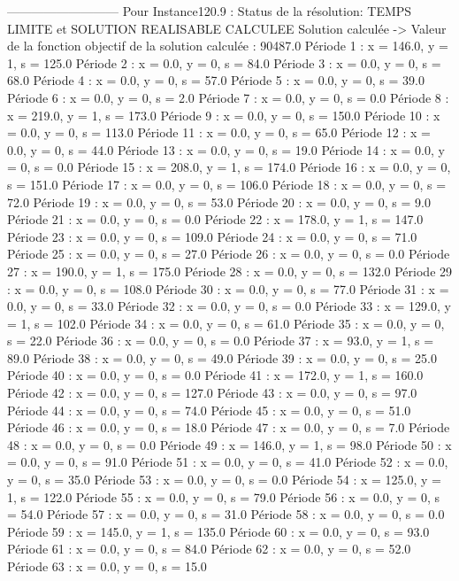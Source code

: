 ---------------------------
Pour Instance120.9 :
Status de la résolution: TEMPS LIMITE et SOLUTION REALISABLE CALCULEE
Solution calculée
-> Valeur de la fonction objectif de la solution calculée :  90487.0
Période 1 : x = 146.0, y = 1, s = 125.0
Période 2 : x = 0.0, y = 0, s = 84.0
Période 3 : x = 0.0, y = 0, s = 68.0
Période 4 : x = 0.0, y = 0, s = 57.0
Période 5 : x = 0.0, y = 0, s = 39.0
Période 6 : x = 0.0, y = 0, s = 2.0
Période 7 : x = 0.0, y = 0, s = 0.0
Période 8 : x = 219.0, y = 1, s = 173.0
Période 9 : x = 0.0, y = 0, s = 150.0
Période 10 : x = 0.0, y = 0, s = 113.0
Période 11 : x = 0.0, y = 0, s = 65.0
Période 12 : x = 0.0, y = 0, s = 44.0
Période 13 : x = 0.0, y = 0, s = 19.0
Période 14 : x = 0.0, y = 0, s = 0.0
Période 15 : x = 208.0, y = 1, s = 174.0
Période 16 : x = 0.0, y = 0, s = 151.0
Période 17 : x = 0.0, y = 0, s = 106.0
Période 18 : x = 0.0, y = 0, s = 72.0
Période 19 : x = 0.0, y = 0, s = 53.0
Période 20 : x = 0.0, y = 0, s = 9.0
Période 21 : x = 0.0, y = 0, s = 0.0
Période 22 : x = 178.0, y = 1, s = 147.0
Période 23 : x = 0.0, y = 0, s = 109.0
Période 24 : x = 0.0, y = 0, s = 71.0
Période 25 : x = 0.0, y = 0, s = 27.0
Période 26 : x = 0.0, y = 0, s = 0.0
Période 27 : x = 190.0, y = 1, s = 175.0
Période 28 : x = 0.0, y = 0, s = 132.0
Période 29 : x = 0.0, y = 0, s = 108.0
Période 30 : x = 0.0, y = 0, s = 77.0
Période 31 : x = 0.0, y = 0, s = 33.0
Période 32 : x = 0.0, y = 0, s = 0.0
Période 33 : x = 129.0, y = 1, s = 102.0
Période 34 : x = 0.0, y = 0, s = 61.0
Période 35 : x = 0.0, y = 0, s = 22.0
Période 36 : x = 0.0, y = 0, s = 0.0
Période 37 : x = 93.0, y = 1, s = 89.0
Période 38 : x = 0.0, y = 0, s = 49.0
Période 39 : x = 0.0, y = 0, s = 25.0
Période 40 : x = 0.0, y = 0, s = 0.0
Période 41 : x = 172.0, y = 1, s = 160.0
Période 42 : x = 0.0, y = 0, s = 127.0
Période 43 : x = 0.0, y = 0, s = 97.0
Période 44 : x = 0.0, y = 0, s = 74.0
Période 45 : x = 0.0, y = 0, s = 51.0
Période 46 : x = 0.0, y = 0, s = 18.0
Période 47 : x = 0.0, y = 0, s = 7.0
Période 48 : x = 0.0, y = 0, s = 0.0
Période 49 : x = 146.0, y = 1, s = 98.0
Période 50 : x = 0.0, y = 0, s = 91.0
Période 51 : x = 0.0, y = 0, s = 41.0
Période 52 : x = 0.0, y = 0, s = 35.0
Période 53 : x = 0.0, y = 0, s = 0.0
Période 54 : x = 125.0, y = 1, s = 122.0
Période 55 : x = 0.0, y = 0, s = 79.0
Période 56 : x = 0.0, y = 0, s = 54.0
Période 57 : x = 0.0, y = 0, s = 31.0
Période 58 : x = 0.0, y = 0, s = 0.0
Période 59 : x = 145.0, y = 1, s = 135.0
Période 60 : x = 0.0, y = 0, s = 93.0
Période 61 : x = 0.0, y = 0, s = 84.0
Période 62 : x = 0.0, y = 0, s = 52.0
Période 63 : x = 0.0, y = 0, s = 15.0
